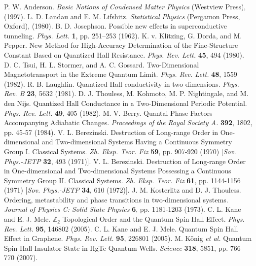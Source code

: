 \documentclass[titlepage,a4paper]{book}
\begin{document}
\begin{thebibliography}{199}
P. W. Anderson. \textit{Basic Notions of Condensed Matter Physics} (Westview Press), (1997).
L. D. Landau and E. M. Lifshitz. \textit{Statistical Physics} (Pergamon Press, Oxford), (1980).
B. D. Josephson. Possible new effects in superconductive tunneling. \textit{Phys. Lett.} \textbf{1}, pp. 251–253 (1962).
K. v. Klitzing, G. Dorda, and M. Pepper. New Method for High-Accuracy Determination of the Fine-Structure Constant Based on Quantized Hall Resistance. \textit{Phys. Rev. Lett.} \textbf{45}, 494 (1980).
D. C. Tsui, H. L. Stormer, and A. C. Gossard. Two-Dimensional Magnetotransport in the Extreme Quantum Limit. \textit{Phys. Rev. Lett.} \textbf{48}, 1559 (1982).
R. B. Laughlin. Quantized Hall conductivity in two dimensions. \textit{Phys. Rev. B} \textbf{23}, 5632 (1981).
D. J. Thouless, M. Kohmoto, M. P. Nightingale, and M. den Nijs. Quantized Hall Conductance in a Two-Dimensional Periodic Potential. \textit{Phys. Rev. Lett.} \textbf{49}, 405 (1982).
M. V. Berry. Quantal Phase Factors Accompanying Adiabatic Changes. \textit{Proceedings of the Royal Society A.} \textbf{392}, 1802, pp. 45-57 (1984).
V. L. Berezinski. Destruction of Long-range Order in One-dimensional and Two-dimensional Systems Having a Continuous Symmetry Group I. Classical Systems. \textit{Zh. Eksp. Teor. Fiz} \textbf{59}, pp. 907-920 (1970) [\textit{Sov. Phys.-JETP} \textbf{32}, 493 (1971)].
V. L. Berezinski. Destruction of Long-range Order in One-dimensional and Two-dimensional Systems Possessing a Continuous Symmetry Group II. Classical Systems. \textit{Zh. Eksp. Teor. Fiz} \textbf{61}, pp. 1144-1156 (1971) [\textit{Sov. Phys.-JETP} \textbf{34}, 610 (1972)].
J. M. Kosterlitz and D. J. Thouless. Ordering, metastability and phase transitions in two-dimensional systems. \textit{Journal of Physics C: Solid State Physics} \textbf{6}, pp. 1181-1203 (1973).
C. L. Kane and E. J. Mele. $\mathbb{Z_2}$ Topological Order and the Quantum Spin Hall Effect. \textit{Phys. Rev. Lett.} \textbf{95}, 146802 (2005).
C. L. Kane and E. J. Mele. Quantum Spin Hall Effect in Graphene. \textit{Phys. Rev. Lett.} \textbf{95}, 226801 (2005).
M. König \textit{et al.} Quantum Spin Hall Insulator State in HgTe Quantum Wells. \textit{Science} \textbf{318}, 5851, pp. 766-770 (2007).

\end{thebibliography}
\end{document}
